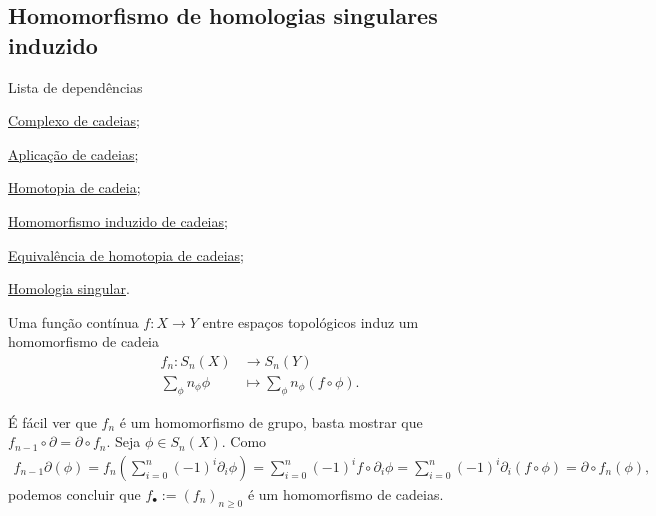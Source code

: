 \subsection{Homomorfismo de homologias singulares induzido} %
\label{homomorfismo-de-homologias-singulares-induzido-prop}
\begin{titlemize}{Lista de dependências}
	\item \hyperref[complexo-de-cadeias-def]{Complexo de cadeias};\\ 
    \item \hyperref[aplicacao-de-cadeias-def]{Aplicação de cadeias};\\
    \item \hyperref[homotopia-de-cadeias-def]{Homotopia de cadeia};\\
    \item \hyperref[homomorfismo-induzido-de-cadeias-prop]{Homomorfismo induzido de cadeias};\\
    \item \hyperref[equivalencia-de-homotopia-de-cadeias-def]{Equivalência de homotopia de cadeias};\\
    \item \hyperref[homologia-singular-def]{Homologia singular}.
\end{titlemize}

\begin{lemma}
    Uma função contínua $f:X\rightarrow Y$ entre espaços topológicos induz um homomorfismo de cadeia 
    \begin{align*}
    f_n:S_n(X)&\longrightarrow S_n(Y)\\
    \sum_{\phi}n_\phi\phi&\longmapsto \sum_\phi n_\phi (f\circ \phi).
    \end{align*}
\end{lemma}

\begin{dem}
    É fácil ver que $f_n$ é um homomorfismo de grupo, basta mostrar que $f_{n-1}\circ\partial=\partial\circ f_n$. Seja $\phi\in S_n(X)$. Como 
    \begin{align*}
        f_{n-1}\partial (\phi)=f_{n}(\sum_{i=0}^n (-1)^i \partial_i \phi)=\sum_{i=0}^n(-1)^i f\circ\partial_i\phi=\sum_{i=0}^n (-1)^i \partial_i(f\circ\phi)=\partial\circ f_n (\phi),
    \end{align*}
    podemos concluir que $f_\bullet:=(f_n)_{n\ge 0}$ é um homomorfismo de cadeias.
\end{dem}


